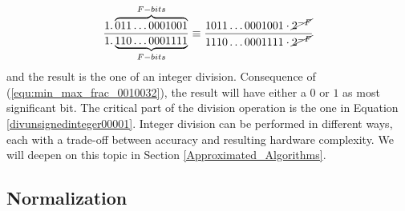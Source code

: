\begin{equation}\label{divunsignedinteger00001}
\frac{1.\overbrace{011\dots0001001}^{F-bits}}{1.\underbrace{110\dots0001111}_{F-bits}} \equiv \frac{1011\dots0001001 \cdot \cancel{2^{-F}}}{1110\dots0001111 \cdot \cancel{2^{-F}}}
\end{equation}
and the result is the one of an integer division. Consequence of (\ref{equ:min_max_frac_0010032}), the result will have either a $0$ or $1$ as most significant bit. 
The critical part of the division operation is the one in Equation \eqref{divunsignedinteger00001}. Integer division can be performed in different ways, each with a trade-off between accuracy and resulting hardware complexity. We will deepen on this topic in Section \ref{Approximated_Algorithms}. 




\subsection{Normalization}


